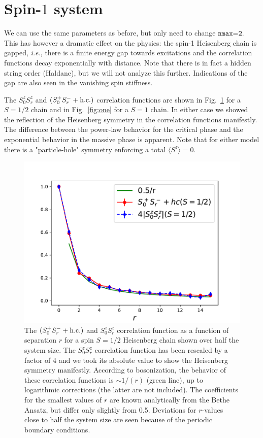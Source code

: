 \documentclass[pra,aps,showpacs,groupedaddress,superscriptaddress,twocolumn,toc=flat]{revtex4-1}
\begin{document}
\section{Spin-$1$ system}
We can use the same parameters as before, but only need to change $\texttt{nmax=2}$. This has however a dramatic effect on the physics: the spin-1 Heisenberg chain is gapped, {\it i.e.}, there is a finite energy gap towards excitations and the correlation functions decay exponentially with distance. Note that there is in fact a hidden string order (Haldane), but we will not analyze this further. Indications of the gap are also seen in the vanishing spin stiffness.

The $S^z_0S^z_r$ and $(S^+_0S^-_r + \rm{h.c.)}$ correlation functions are shown in Fig.~\ref{fig:half} for a $S=1/2$ chain and in Fig.~\ref{fig:one} for a $S=1$ chain. In either case we showed the reflection of the Heisenberg symmetry in the correlation functions manifestly. The difference between the power-law behavior for the critical phase and the exponential behavior in the massive phase is apparent.
Note that for either model there is a "particle-hole" symmetry enforcing a total $\langle S^z\rangle=0$. 




\begin{figure}[h!]
\centering
\includegraphics[width=0.6\linewidth]{fig_corr_half.pdf}
\caption{The $(S^+_0S^-_r + {\rm h.c.})$ and $S^z_0S^z_r$ correlation function as a function of separation $r$ for a spin $S=1/2$ Heisenberg chain shown over half the system size. 
The $S^z_0S^z_r$ correlation function has been rescaled by a factor of 4 and we took its absolute value to show the Heisenberg symmetry manifestly. 
According to bosonization, the behavior of these correlation functions is $\sim 1/(r)$ (green line), up to logarithmic corrections (the latter are not included). The coefficients for the smallest values of $r$ are known analytically from the Bethe Ansatz, but differ only slightly from 0.5.
Deviations for $r$-values close to half the system size are seen because of the periodic boundary conditions. } 
\label{fig:half}
\end{figure}
\end{document}
